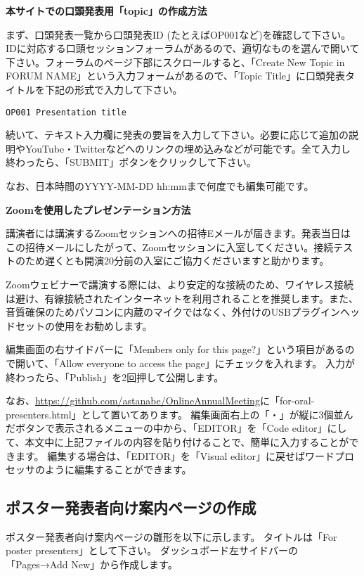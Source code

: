 \documentclass[titlepage,10pt,a4paper,uplatex]{jsbook}
\newenvironment{content}{\begin{shaded}\vspace{-1em}\raggedright\ttfamily\footnotesize\setlength{\baselineskip}{1.4em}}{\end{shaded}\vspace{-1em}}
\renewcommand{\textbf}[1]{{\bfseries\sffamily#1}}
\begin{document}
\begin{content}
\textbf{\Large 本サイトでの口頭発表用「topic」の作成方法}

まず、口頭発表一覧から口頭発表ID (たとえばOP001など)を確認して下さい。IDに対応する口頭セッションフォーラムがあるので、適切なものを選んで開いて下さい。フォーラムのページ下部にスクロールすると、「Create New Topic in FORUM NAME」という入力フォームがあるので、「Topic Title」に口頭発表タイトルを下記の形式で入力して下さい。

\texttt{OP001 Presentation title}

続いて、テキスト入力欄に発表の要旨を入力して下さい。必要に応じて追加の説明やYouTube・Twitterなどへのリンクの埋め込みなどが可能です。全て入力し終わったら、「SUBMIT」ボタンをクリックして下さい。

なお、日本時間のYYYY-MM-DD hh:mmまで何度でも編集可能です。

\textbf{\Large Zoomを使用したプレゼンテーション方法}

講演者には講演するZoomセッションへの招待Eメールが届きます。発表当日はこの招待メールにしたがって、Zoomセッションに入室してください。接続テストのため遅くとも開演20分前の入室にご協力くださいますと助かります。

Zoomウェビナーで講演する際には、より安定的な接続のため、ワイヤレス接続は避け、有線接続されたインターネットを利用されることを推奨します。また、音質確保のためパソコンに内蔵のマイクではなく、外付けのUSBプラグインヘッドセットの使用をお勧めします。
\end{content}

編集画面の右サイドバーに「Members only for this page?」という項目があるので開いて、「Allow everyone to access the page」にチェックを入れます。
入力が終わったら、「Publish」を2回押して公開します。

なお、\url{https://github.com/astanabe/OnlineAnnualMeeting}に「for-oral-presenters.html」として置いてあります。
編集画面右上の「・」が縦に3個並んだボタンで表示されるメニューの中から、「EDITOR」を「Code editor」にして、本文中に上記ファイルの内容を貼り付けることで、簡単に入力することができます。
編集する場合は、「EDITOR」を「Visual editor」に戻せばワードプロセッサのように編集することができます。

\subsection{ポスター発表者向け案内ページの作成}

ポスター発表者向け案内ページの雛形を以下に示します。
タイトルは「For poster presenters」として下さい。
ダッシュボード左サイドバーの「Pages→Add New」から作成します。
\end{document}
